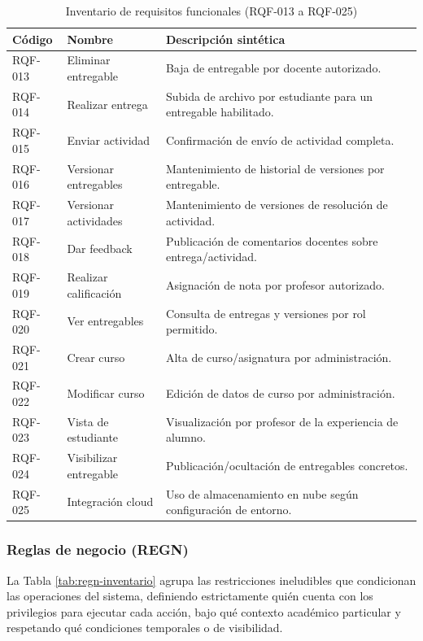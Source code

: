 \begin{table}[!htbp]
\centering
\small
\begin{tabular}{|P{1.4cm}|P{3.3cm}|P{7.1cm}|}
\hline
\textbf{C\'odigo} & \textbf{Nombre} & \textbf{Descripci\'on sint\'etica} \\
\hline
RQF-013 & Eliminar entregable & Baja de entregable por docente autorizado. \\
\hline
RQF-014 & Realizar entrega & Subida de archivo por estudiante para un entregable habilitado. \\
\hline
RQF-015 & Enviar actividad & Confirmaci\'on de env\'io de actividad completa. \\
\hline
RQF-016 & Versionar entregables & Mantenimiento de historial de versiones por entregable. \\
\hline
RQF-017 & Versionar actividades & Mantenimiento de versiones de resoluci\'on de actividad. \\
\hline
RQF-018 & Dar feedback & Publicaci\'on de comentarios docentes sobre entrega/actividad. \\
\hline
RQF-019 & Realizar calificaci\'on & Asignaci\'on de nota por profesor autorizado. \\
\hline
RQF-020 & Ver entregables & Consulta de entregas y versiones por rol permitido. \\
\hline
RQF-021 & Crear curso & Alta de curso/asignatura por administraci\'on. \\
\hline
RQF-022 & Modificar curso & Edici\'on de datos de curso por administraci\'on. \\
\hline
RQF-023 & Vista de estudiante & Visualizaci\'on por profesor de la experiencia de alumno. \\
\hline
RQF-024 & Visibilizar entregable & Publicaci\'on/ocultaci\'on de entregables concretos. \\
\hline
RQF-025 & Integraci\'on cloud & Uso de almacenamiento en nube seg\'un configuraci\'on de entorno. \\
\hline
\end{tabular}
\normalsize
\caption{Inventario de requisitos funcionales (RQF-013 a RQF-025)}
\label{tab:rqf-inventario-2}
\end{table}

\FloatBarrier
\subsubsection*{Reglas de negocio (REGN)}

La Tabla \ref{tab:regn-inventario} agrupa las restricciones ineludibles que condicionan las operaciones del sistema, definiendo estrictamente qui\'en cuenta con los privilegios para ejecutar cada acci\'on, bajo qu\'e contexto acad\'emico particular y respetando qu\'e condiciones temporales o de visibilidad.

